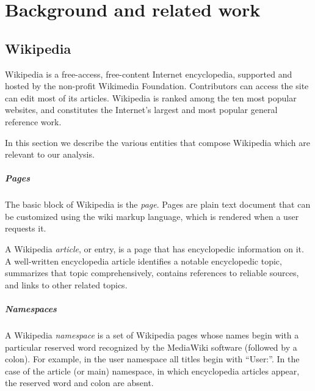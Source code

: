 
\chapter{Background and related work}
\label{cha:background}


\section{Wikipedia}
\label{sec:wiki}
Wikipedia is a free-access, free-content Internet encyclopedia, supported and hosted by the non-profit Wikimedia Foundation.
Contributors can access the site can edit most of its articles.
Wikipedia is ranked among the ten most popular websites, and constitutes the Internet's largest and most popular general reference work.

In this section we describe the various entities that compose Wikipedia which are relevant to our analysis.

\paragraph{Pages}
The basic block of Wikipedia is the \emph{page}.
Pages are plain text document that can be customized using the wiki markup language, which is rendered when a user requests it.

A Wikipedia \emph{article}, or entry, is a page that has encyclopedic information on it.
A well-written encyclopedia article identifies a notable encyclopedic topic, summarizes that topic comprehensively, contains references to reliable sources, and links to other related topics.

\paragraph{Namespaces}
A Wikipedia \emph{namespace} is a set of Wikipedia pages whose names begin with a particular reserved word recognized by the MediaWiki software (followed by a colon).
For example, in the user namespace all titles begin with ``User:''.
In the case of the article (or main) namespace, in which encyclopedia articles appear, the reserved word and colon are absent.

